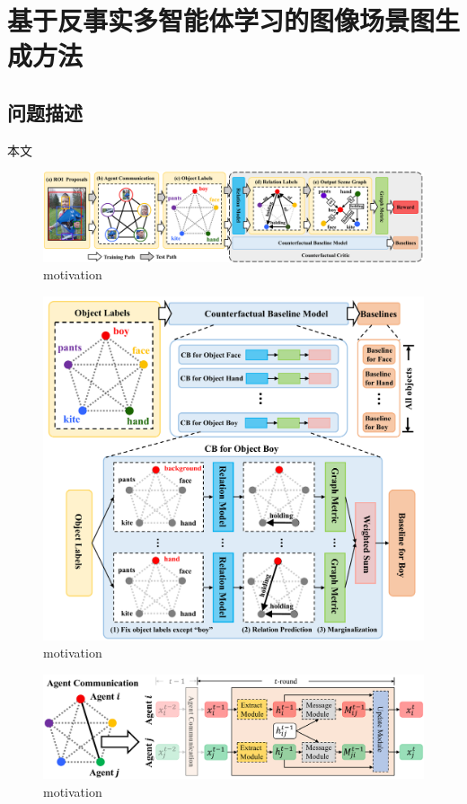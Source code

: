\chapter{基于反事实多智能体学习的图像场景图生成方法}

\section{问题描述}

本文
\begin{figure}[htbp]
    \centering
    \includegraphics[width=\linewidth]{chapter4/res/architecture.pdf}
    \caption{motivation}
    \label{xx}
\end{figure}

\begin{figure}[htbp]
    \centering
    \includegraphics[width=\linewidth]{chapter4/res/baseline.pdf}
    \caption{motivation}
    \label{xx}
\end{figure}

\begin{figure}[htbp]
    \centering
    \includegraphics[width=\linewidth]{chapter4/res/communication.pdf}
    \caption{motivation}
    \label{xx}
\end{figure}

